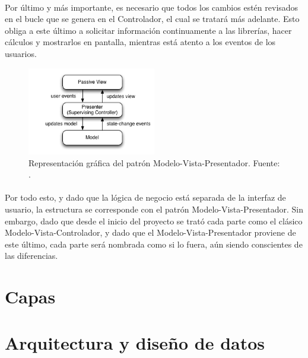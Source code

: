 \documentclass{subfiles}
\begin{document}
        \paragraph{}
        Por último y más importante, es necesario que todos los cambios estén revisados en el bucle que se genera en el Controlador, el cual se tratará más adelante. Esto obliga a este último a solicitar información continuamente a las librerías, hacer cálculos y mostrarlos en pantalla, mientras está atento a los eventos de los usuarios.

        \begin{figure}
        \centering
        \includegraphics[width=0.5\textwidth]{img/mvp.png}
        \caption{Representación gráfica del patrón Modelo-Vista-Presentador. Fuente: .}
        \label{fig:mvp}
        \end{figure}

        \paragraph{}
        Por todo esto, y dado que la lógica de negocio está separada de la interfaz de usuario, la estructura se corresponde con el patrón Modelo-Vista-Presentador. Sin embargo, dado que desde el inicio del proyecto se trató cada parte como el clásico Modelo-Vista-Controlador, y dado que el Modelo-Vista-Presentador proviene de este último, cada parte será nombrada como si lo fuera, aún siendo conscientes de las diferencias.

        \section{Capas}
        \label{sec:capas}

        \section{Arquitectura y diseño de datos}
        \label{sec:arquitectura_y_diseno_de_datos}
\end{document}
